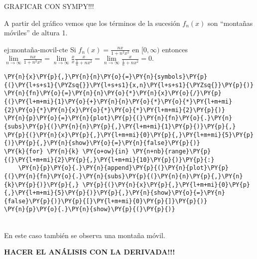 GRAFICAR CON SYMPY!!!

A partir del gráfico vemos que los términos de la sucesión $f_n(x)$ son ``montañas móviles'' de altura 1.


\begin{ejemplo}{ej:montaña-movil-cte}
Si  $f_n(x)=\frac{nx}{1+n^2x^2}$ en $[0,\infty)$
entonces 
$\lim\limits_{n \to \infty} \frac{nx}{1+n^2x^2}=
\lim\limits_{n\to \infty} \frac{x}{x}\frac{x}{\frac{1}{n}+nx^2}=
\lim\limits_{n \to \infty}\frac{x}{\frac{1}{n}+nx^2}=0.$ 
\end{ejemplo}


    \begin{tcolorbox}[breakable, size=fbox, boxrule=1pt, pad at break*=1mm,colback=cellbackground, colframe=cellborder]
\begin{Verbatim}[commandchars=\\\{\}]
\PY{n}{x}\PY{p}{,}\PY{n}{n}\PY{o}{=}\PY{n}{symbols}\PY{p}{(}\PY{l+s+s1}{\PYZsq{}}\PY{l+s+s1}{x,n}\PY{l+s+s1}{\PYZsq{}}\PY{p}{)}
\PY{n}{fn}\PY{o}{=}\PY{n}{n}\PY{o}{*}\PY{n}{x}\PY{o}{/}\PY{p}{(}\PY{l+m+mi}{1}\PY{o}{+}\PY{n}{n}\PY{o}{*}\PY{o}{*}\PY{l+m+mi}{2}\PY{o}{*}\PY{n}{x}\PY{o}{*}\PY{o}{*}\PY{l+m+mi}{2}\PY{p}{)}
\PY{n}{p}\PY{o}{=}\PY{n}{plot}\PY{p}{(}\PY{n}{fn}\PY{o}{.}\PY{n}{subs}\PY{p}{(}\PY{n}{n}\PY{p}{,}\PY{l+m+mi}{1}\PY{p}{)}\PY{p}{,} \PY{p}{(}\PY{n}{x}\PY{p}{,}\PY{l+m+mi}{0}\PY{p}{,}\PY{l+m+mi}{5}\PY{p}{)}\PY{p}{,}\PY{n}{show}\PY{o}{=}\PY{n}{false}\PY{p}{)}
\PY{k}{for} \PY{n}{k} \PY{o+ow}{in} \PY{n+nb}{range}\PY{p}{(}\PY{l+m+mi}{2}\PY{p}{,}\PY{l+m+mi}{10}\PY{p}{)}\PY{p}{:}
    \PY{n}{p}\PY{o}{.}\PY{n}{append}\PY{p}{(}\PY{n}{plot}\PY{p}{(}\PY{n}{fn}\PY{o}{.}\PY{n}{subs}\PY{p}{(}\PY{n}{n}\PY{p}{,}\PY{n}{k}\PY{p}{)}\PY{p}{,} \PY{p}{(}\PY{n}{x}\PY{p}{,}\PY{l+m+mi}{0}\PY{p}{,}\PY{l+m+mi}{5}\PY{p}{)}\PY{p}{,}\PY{n}{show}\PY{o}{=}\PY{n}{false}\PY{p}{)}\PY{p}{[}\PY{l+m+mi}{0}\PY{p}{]}\PY{p}{)}
\PY{n}{p}\PY{o}{.}\PY{n}{show}\PY{p}{(}\PY{p}{)}
\end{Verbatim}
\end{tcolorbox}

    \begin{center}
    \end{center}
    { \hspace*{\fill} \\}
En este caso también se observa una montaña móvil. 

\textbf{HACER EL ANÁLISIS CON LA DERIVADA!!!}

